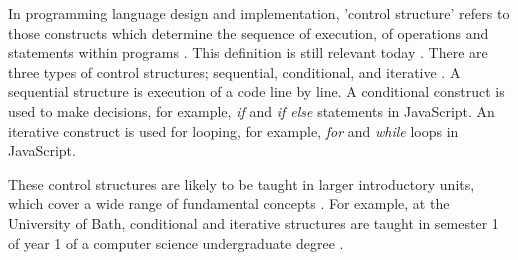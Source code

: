 \documentclass[a4paper,11.5pt]{report}
\numberwithin{figure}{section}
\numberwithin{table}{section}
\numberwithin{equation}{section}
\numberwithin{equation}{section}
\begin{document}

In programming language design and implementation, 'control structure' refers to those constructs which determine the sequence of execution, of operations and statements within programs \citep{riccardi1981}. This definition is still relevant today \citep[see][]{wikiversity}. There are three types of control structures; sequential, conditional, and iterative \citep{leppanen2007}. A sequential structure is execution of a code line by line. A conditional construct is used to make decisions, for example, \textit{if} and \textit{if else} statements in JavaScript. An iterative construct is used for looping, for example, \textit{for} and \textit{while} loops in JavaScript.

These control structures are likely to be taught in larger introductory units, which cover a wide range of fundamental concepts \citep{acm}. For example, at the University of Bath, conditional and iterative structures are taught in semester 1 of year 1 of a computer science undergraduate degree \citep{bath}. 



\end{document}
